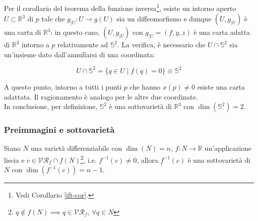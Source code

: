 Per il corollario del teorema della funzione inversa\footnote{%
	Vedi Corollario \ref{ift-cor}.%
}, esiste un intorno aperto $ U \subset \mathbb{R}^{3} $ di $ p $ tale che $ g_{|U} : U \to g(U) $ sia un diffeomorfismo e dunque $ (U,g_{|U}) $ è una carta di $ \mathbb{R}^{3} $: in questo caso, $ (U,g_{|U}) $ con $ g_{|U} = (f,y,z) $ è una carta adatta di $ \mathbb{R}^{3} $ intorno a $ p $ relativamente ad $ \mathbb{S}^{2} $. La verifica, è necessario che $ U \cap \mathbb{S}^{2} $ sia un'insieme dato dall'annullarsi di una coordinata:

\begin{equation}
	U \cap \mathbb{S}^{2} = \{ q \in U \mid f(q) = 0 \} \equiv \mathbb{S}^{2}
\end{equation}

A questo punto, intorno a tutti i punti $ p $ che hanno $ x(p) \neq 0 $ esiste una carta adattata. Il ragionamento è analogo per le altre due coordinate.\\
In conclusione, per definizione, $ \mathbb{S}^{2}$ è una sottovarietà di $\mathbb{R}^{3} $ con $ \dim(\mathbb{S}^{2})=2 $.

\subsubsection{Preimmagini e sottovarietà}

\begin{theorem}[Preimmagine di un valore regolare (caso $ M = \mathbb{R} $)]
	Siano $ N $ una varietà differenziabile con $ \dim(N)=n $, $ f : N \to \mathbb{R} $ un'applicazione liscia e $ c \in \mathcal{VR}_{f} \cap f(N) $\footnote{%
		$ q \notin f(N) \implies q \in \mathcal{VR}_{f}, \, \forall q \in N $%
	}, i.e. $ f^{-1}(c) \neq 0 $, allora $ f^{-1}(c) $ è una sottovarietà di $ N $ con $ \dim(f^{-1}(c)) = n-1 $.
\end{theorem}

